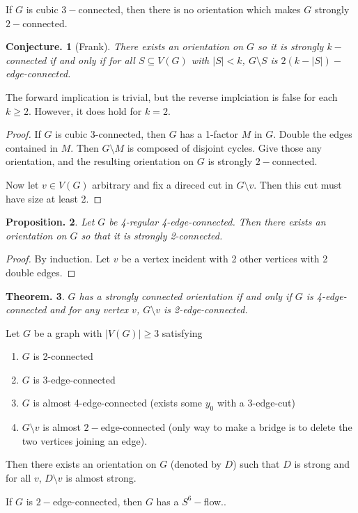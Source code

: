 \documentclass[11pt, a4paper]{memoir}
\theoremstyle{change}
\newtheorem{theorem}{Theorem.}[section]
\newtheorem{conjecture}[theorem]{Conjecture.}
\newtheorem{proposition}[theorem]{Proposition.}
\theoremstyle{plain}
\theoremstyle{nonumberplain}
\newtheorem{proof}{Proof}
\numberwithin{equation}{section}
\begin{document}
If $G$ is cubic $3-$connected, then there is no orientation which makes $G$ strongly $2-$connected.
\begin{conjecture}[Frank]
    There exists an orientation on $G$ so it is strongly $k-$connected if and only if for all $S\subseteq V(G)$ with $|S|<k$, $G\setminus S$ is $2(k-|S|)-$edge-connected.
\end{conjecture}
The forward implication is trivial, but the reverse implciation is false for each $k\geq 2$.
However, it does hold for $k=2$.
\begin{proof}
    If $G$ is cubic 3-connected, then $G$ has a 1-factor $M$ in $G$.
    Double the edges contained in $M$.
    Then $G\setminus M$ is composed of disjoint cycles.
    Give those any orientation, and the resulting orientation on $G$ is strongly $2-$connected.

    Now let $v\in V(G)$ arbitrary and fix a direced cut in $G\setminus v$.
    Then this cut must have size at least 2.

\end{proof}
\begin{proposition}
    Let $G$ be 4-regular 4-edge-connected.
    Then there exists an orientation on $G$ so that it is strongly 2-connected.
\end{proposition}
\begin{proof}
    By induction.
    Let $v$ be a vertex incident with 2 other vertices with 2 double edges.
\end{proof}
\begin{theorem}
    $G$ has a strongly connected orientation if and only if $G$ is 4-edge-connected and for any vertex $v$, $G\setminus v$ is 2-edge-connected.
\end{theorem}
Let $G$ be a graph with $|V(G)|\geq 3$ satisfying
\begin{enumerate}[nl]
    \item $G$ is 2-connected
    \item $G$ is 3-edge-connected
    \item $G$ is almost 4-edge-connected (exists some $y_0$ with a 3-edge-cut)
    \item $G\setminus v$ is almost $2-$edge-connected (only way to make a bridge is to delete the two vertices joining an edge).
\end{enumerate}
Then there exists an orientation on $G$ (denoted by $D$) such that $D$ is strong and for all $v$, $D\setminus v$ is almost strong.

If $G$ is $2-$edge-connected, then $G$ has a $S^6-$flow..
\end{document}
